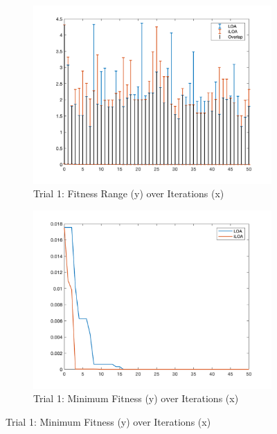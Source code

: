 \begin{figure}
  \centering
  \begin{subfigure}[b]{0.4\textwidth}
    \includegraphics[width=\textwidth]{img/bars/f1/1}
    \caption{ \scriptsize Trial 1: Fitness Range (y) over Iterations (x)}
    \label{fig:f1-b-1}
  \end{subfigure}
  \begin{subfigure}[b]{0.4\textwidth}
    \includegraphics[width=\textwidth]{img/fits/f1/1}
    \caption{ \scriptsize Trial 1: Minimum Fitness (y) over Iterations (x)}
    \label{fig:f1-f-1}
  \end{subfigure}


\end{figure}
